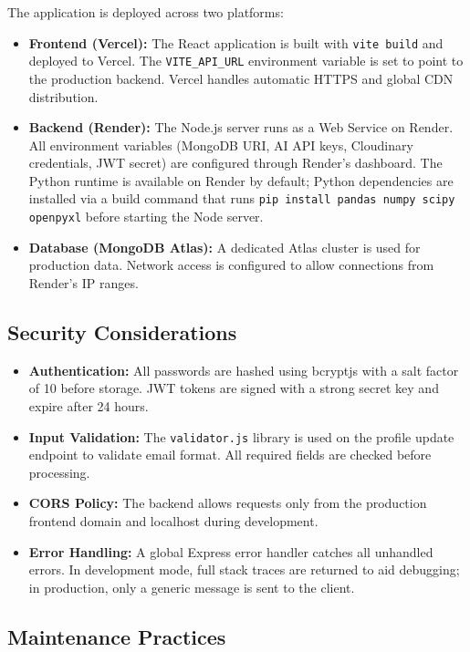 \documentclass[12pt,a4paper]{article}
\begin{document}
The application is deployed across two platforms:

\begin{itemize}
    \item \textbf{Frontend (Vercel):} The React application is built with \texttt{vite build} and deployed to Vercel. The \texttt{VITE\_API\_URL} environment variable is set to point to the production backend. Vercel handles automatic HTTPS and global CDN distribution.

    \item \textbf{Backend (Render):} The Node.js server runs as a Web Service on Render. All environment variables (MongoDB URI, AI API keys, Cloudinary credentials, JWT secret) are configured through Render's dashboard. The Python runtime is available on Render by default; Python dependencies are installed via a build command that runs \texttt{pip install pandas numpy scipy openpyxl} before starting the Node server.

    \item \textbf{Database (MongoDB Atlas):} A dedicated Atlas cluster is used for production data. Network access is configured to allow connections from Render's IP ranges.
\end{itemize}

\subsection{Security Considerations}

\begin{itemize}
    \item \textbf{Authentication:} All passwords are hashed using bcryptjs with a salt factor of 10 before storage. JWT tokens are signed with a strong secret key and expire after 24 hours.
    \item \textbf{Input Validation:} The \texttt{validator.js} library is used on the profile update endpoint to validate email format. All required fields are checked before processing.
    \item \textbf{CORS Policy:} The backend allows requests only from the production frontend domain and localhost during development.
    \item \textbf{Error Handling:} A global Express error handler catches all unhandled errors. In development mode, full stack traces are returned to aid debugging; in production, only a generic message is sent to the client.
\end{itemize}

\subsection{Maintenance Practices}
\end{document}
